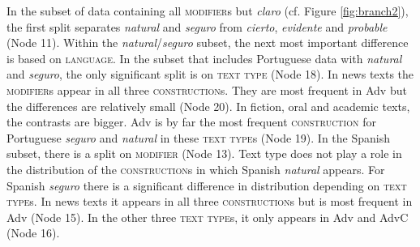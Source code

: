 In the subset of data containing all \textsc{modifier}s but \textit{claro} (cf. Figure \ref{fig:branch2}), the first split separates \textit{natural} and \textit{seguro} from \textit{cierto}, \textit{evidente} and \textit{probable} (Node 11). Within the \textit{natural}/\textit{seguro} subset, the next most important difference is based on \textsc{language}. In the subset that includes Portuguese data with \textit{natural} and \textit{seguro}, the only significant split is on \textsc{text type} (Node 18). In news texts the \textsc{modifier}s appear in all three \textsc{construction}s. They are most frequent in Adv but the differences are relatively small (Node 20). In fiction, oral and academic texts, the contrasts are bigger. Adv is by far the most frequent \textsc{construction} for Portuguese \textit{seguro} and \textit{natural} in these \textsc{text type}s (Node 19). In the Spanish subset, there is a split on \textsc{modifier} (Node 13). Text type does not play a role in the distribution of the \textsc{construction}s in which Spanish \textit{natural} appears. For Spanish \textit{seguro} there is a significant difference in  distribution depending on \textsc{text type}s. In news texts it appears in  all three \textsc{construction}s but is most frequent in Adv (Node 15). In the other three \textsc{text type}s, it only appears in Adv and AdvC (Node 16).

